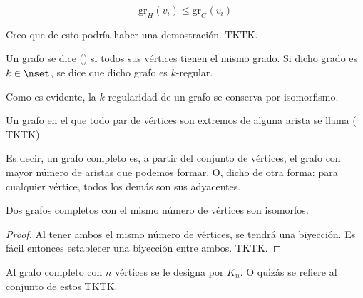 $$ \text{gr}_H(v_i) \leq \text{gr}_G(v_i) $$

Creo que de esto podría haber una demostración. TKTK.

\begin{deffinition}
  Un grafo se dice  () si todos sus vértices tienen
  el mismo grado. Si dicho grado es $k \in \nset$, se dice que dicho grafo
  es $k$-regular.
\end{deffinition}

Como es evidente, la $k$-regularidad de un grafo se conserva por
isomorfismo.

\begin{deffinition}
  Un grafo en el que todo par de vértices son extremos de alguna arista se
  llama  ( TKTK).
\end{deffinition}

Es decir, un grafo completo es, a partir del conjunto de vértices, el grafo
con mayor número de aristas que podemos formar. O, dicho de otra forma: para
cualquier vértice, todos los demás son sus adyacentes.

\begin{proposition}
  Dos grafos completos con el mismo número de vértices son isomorfos.
\end{proposition}

\begin{proof}
  Al tener ambos el mismo número de vértices, se tendrá una biyección. Es
  fácil entonces establecer una biyección entre ambos. TKTK.
\end{proof}

Al grafo completo con $n$ vértices se le designa por $K_n$. O quizás se
refiere al conjunto de estos TKTK.















